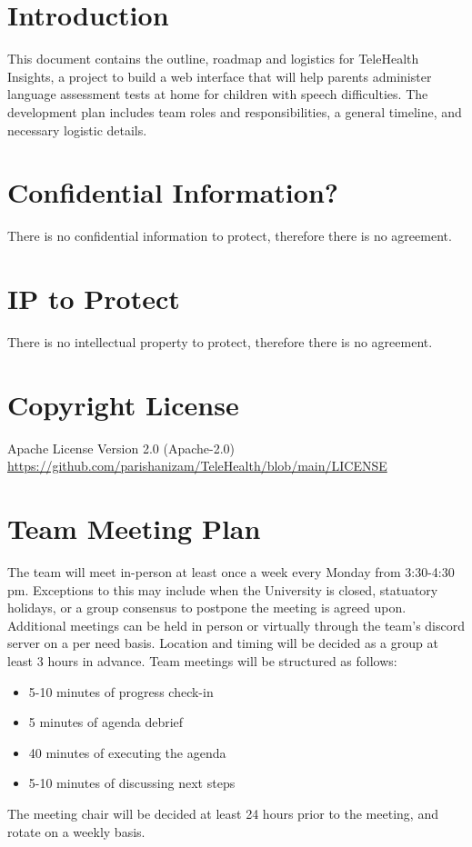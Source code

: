 \documentclass{article}
\begin{document}
\newpage{}

\section*{Introduction}

This document contains the outline, roadmap and logistics for TeleHealth Insights, a project to build a web 
interface that will help parents administer language assessment tests at home for children with speech
difficulties. The development plan includes team roles and responsibilities, a general timeline, and 
necessary logistic details.

\section{Confidential Information?}

There is no confidential information to protect, therefore there is no agreement.

\section{IP to Protect}

There is no intellectual property to protect, therefore there is no agreement.

\section{Copyright License}

Apache License Version 2.0 (Apache-2.0) \\
\url{https://github.com/parishanizam/TeleHealth/blob/main/LICENSE}

\section{Team Meeting Plan}

The team will meet in-person at least once a week every Monday from 3:30-4:30 pm. Exceptions to this 
may include when the University is closed, statuatory holidays, or a group consensus to postpone the meeting
is agreed upon. Additional meetings can be held in person or virtually through the team's discord server on 
a per need basis. Location and timing will be decided as a group at least 3 hours in advance. Team meetings will
be structured as follows:
\begin{itemize}
  \item 5-10 minutes of progress check-in 
  \item 5 minutes of agenda debrief
  \item 40 minutes of executing the agenda
  \item 5-10 minutes of discussing next steps
\end{itemize}
\indent The meeting chair will be decided at least 24 hours prior to the meeting, and rotate on a weekly basis.
\end{document}
